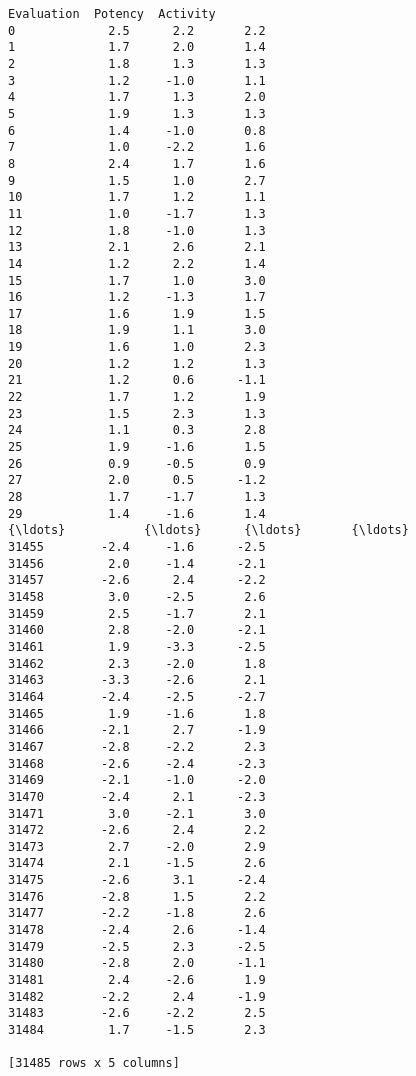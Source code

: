 \documentclass[11pt]{article}
\begin{document}
\begin{Verbatim}[commandchars=\\\{\}]
       Evaluation  Potency  Activity  
0             2.5      2.2       2.2  
1             1.7      2.0       1.4  
2             1.8      1.3       1.3  
3             1.2     -1.0       1.1  
4             1.7      1.3       2.0  
5             1.9      1.3       1.3  
6             1.4     -1.0       0.8  
7             1.0     -2.2       1.6  
8             2.4      1.7       1.6  
9             1.5      1.0       2.7  
10            1.7      1.2       1.1  
11            1.0     -1.7       1.3  
12            1.8     -1.0       1.3  
13            2.1      2.6       2.1  
14            1.2      2.2       1.4  
15            1.7      1.0       3.0  
16            1.2     -1.3       1.7  
17            1.6      1.9       1.5  
18            1.9      1.1       3.0  
19            1.6      1.0       2.3  
20            1.2      1.2       1.3  
21            1.2      0.6      -1.1  
22            1.7      1.2       1.9  
23            1.5      2.3       1.3  
24            1.1      0.3       2.8  
25            1.9     -1.6       1.5  
26            0.9     -0.5       0.9  
27            2.0      0.5      -1.2  
28            1.7     -1.7       1.3  
29            1.4     -1.6       1.4  
{\ldots}           {\ldots}      {\ldots}       {\ldots}  
31455        -2.4     -1.6      -2.5  
31456         2.0     -1.4      -2.1  
31457        -2.6      2.4      -2.2  
31458         3.0     -2.5       2.6  
31459         2.5     -1.7       2.1  
31460         2.8     -2.0      -2.1  
31461         1.9     -3.3      -2.5  
31462         2.3     -2.0       1.8  
31463        -3.3     -2.6       2.1  
31464        -2.4     -2.5      -2.7  
31465         1.9     -1.6       1.8  
31466        -2.1      2.7      -1.9  
31467        -2.8     -2.2       2.3  
31468        -2.6     -2.4      -2.3  
31469        -2.1     -1.0      -2.0  
31470        -2.4      2.1      -2.3  
31471         3.0     -2.1       3.0  
31472        -2.6      2.4       2.2  
31473         2.7     -2.0       2.9  
31474         2.1     -1.5       2.6  
31475        -2.6      3.1      -2.4  
31476        -2.8      1.5       2.2  
31477        -2.2     -1.8       2.6  
31478        -2.4      2.6      -1.4  
31479        -2.5      2.3      -2.5  
31480        -2.8      2.0      -1.1  
31481         2.4     -2.6       1.9  
31482        -2.2      2.4      -1.9  
31483        -2.6     -2.2       2.5  
31484         1.7     -1.5       2.3  

[31485 rows x 5 columns]

    \end{Verbatim}
\end{document}
